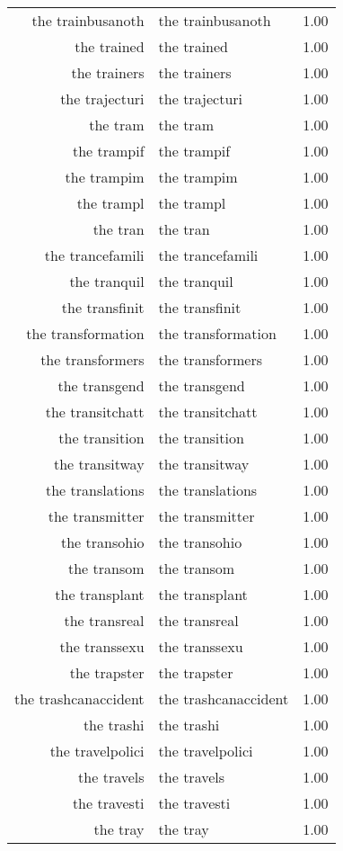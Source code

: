 \begin{table}[ht]
\begin{tabular}{rlr}
  the trainbusanoth & the trainbusanoth & 1.00 \\ 
  the trained & the trained & 1.00 \\ 
  the trainers & the trainers & 1.00 \\ 
  the trajecturi & the trajecturi & 1.00 \\ 
  the tram & the tram & 1.00 \\ 
  the trampif & the trampif & 1.00 \\ 
  the trampim & the trampim & 1.00 \\ 
  the trampl & the trampl & 1.00 \\ 
  the tran & the tran & 1.00 \\ 
  the trancefamili & the trancefamili & 1.00 \\ 
  the tranquil & the tranquil & 1.00 \\ 
  the transfinit & the transfinit & 1.00 \\ 
  the transformation & the transformation & 1.00 \\ 
  the transformers & the transformers & 1.00 \\ 
  the transgend & the transgend & 1.00 \\ 
  the transitchatt & the transitchatt & 1.00 \\ 
  the transition & the transition & 1.00 \\ 
  the transitway & the transitway & 1.00 \\ 
  the translations & the translations & 1.00 \\ 
  the transmitter & the transmitter & 1.00 \\ 
  the transohio & the transohio & 1.00 \\ 
  the transom & the transom & 1.00 \\ 
  the transplant & the transplant & 1.00 \\ 
  the transreal & the transreal & 1.00 \\ 
  the transsexu & the transsexu & 1.00 \\ 
  the trapster & the trapster & 1.00 \\ 
  the trashcanaccident & the trashcanaccident & 1.00 \\ 
  the trashi & the trashi & 1.00 \\ 
  the travelpolici & the travelpolici & 1.00 \\ 
  the travels & the travels & 1.00 \\ 
  the travesti & the travesti & 1.00 \\ 
  the tray & the tray & 1.00 \\ 

\end{tabular}
\end{table}
